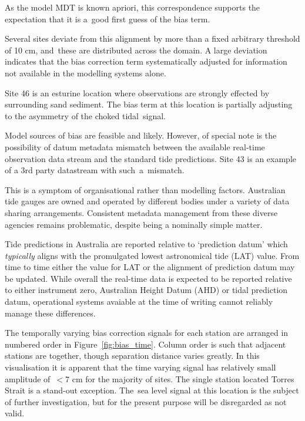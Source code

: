 As the model MDT is known apriori, this correspondence supports the expectation that it is a~good first guess of the bias term.

Several sites deviate from this alignment by more than a fixed arbitrary threshold of 10 cm, and~these are distributed across the domain.
A large deviation indicates that the bias correction term systematically adjusted for information not available in the modelling systems alone.  


Site 46 is an esturine location where observations are strongly effected by surrounding sand sediment. The bias term at this location is partially adjusting to the asymmetry of the choked tidal~signal. 


Model sources of bias are feasible and likely.
However, of special note is the possibility of datum metadata mismatch between the available real-time observation data stream and the standard tide predictions. 
Site 43 is an example of a 3rd party datastream with such~a~mismatch. 

This is a symptom of organisational rather than modelling factors.   
Australian tide gauges are owned and operated by different bodies under a variety of data sharing arrangements.
Consistent metadata management from these diverse agencies remains problematic, despite being a nominally simple matter.

Tide predictions in Australia are reported relative to `prediction datum' which \textit{typically} aligns with the promulgated lowest astronomical tide (LAT) value.   
From time to time either the value for LAT or the alignment of prediction datum may be updated.  
While overall the real-time data is expected to be reported relative to either instrument zero, Australian Height Datum (AHD) or tidal prediction datum, operational systems avaiable at the time of writing cannot reliably manage these differences.


The temporally varying bias correction signals for each station are arranged in numbered order in Figure~\ref{fig:bias_time}.
Column order is such that adjacent stations are together, though separation distance varies greatly. 
In this visualisation it is apparent that the time varying signal has relatively small amplitude of~$<$7 cm for the majority of sites.
The single station located Torres Strait is a stand-out exception.  The~sea level signal at this location is the subject of further investigation, but for the present purpose will be disregarded as not valid.  


